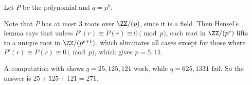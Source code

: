 \documentclass[11pt]{scrartcl}
\begin{document}
\begin{solution}{}
	Let $P$ be the polynomial and $q = p^k$.
	
	Note that $P$ has at most $3$ roots over $\ZZ/(p)$, since it is a field. Then Hensel's lemma says that unless $P'(r) \equiv P(r) \equiv 0 \pmod p$, each root in $\ZZ/(p^e)$ lifts to a unique root in $\ZZ/(p^{e + 1})$, which eliminates all cases except for those where $P'(r) \equiv P(r) \equiv 0 \pmod p$, which gives $p = 5,11$.

	A computation with  shows $q = 25,125,121$ work, while $q = 625,1331$ fail. So the answer is $25 + 125 + 121 = 271$.
\end{solution}
\end{document}
